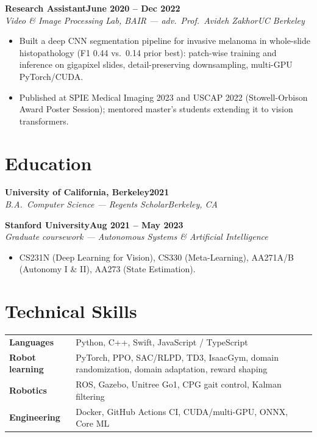 \documentclass[10pt]{article}
\newcommand{\role}[4]{\textbf{#1}\hfill\textbf{#2}\\\textit{#3}\hfill\textit{#4}}
\begin{document}
\role{Research Assistant}{June 2020 -- Dec 2022}{Video \& Image Processing Lab, BAIR --- adv.\ Prof.\ Avideh Zakhor}{UC Berkeley}
\begin{itemize}
\item Built a deep CNN segmentation pipeline for invasive melanoma in whole-slide histopathology (F1 0.44 vs.\ 0.14 prior best): patch-wise training and inference on gigapixel slides, detail-preserving downsampling, multi-GPU PyTorch/CUDA.
\item Published at SPIE Medical Imaging 2023 and USCAP 2022 (Stowell-Orbison Award Poster Session); mentored master's students extending it to vision transformers.
\end{itemize}


\section*{Education}

\role{University of California, Berkeley}{2021}{B.A.\ Computer Science --- Regents Scholar}{Berkeley, CA}

\role{Stanford University}{Aug 2021 -- May 2023}{Graduate coursework --- Autonomous Systems \& Artificial Intelligence}{}
\begin{itemize}
\item CS231N (Deep Learning for Vision), CS330 (Meta-Learning), AA271A/B (Autonomy I \& II), AA273 (State Estimation).
\end{itemize}

\section*{Technical Skills}
\begin{tabular}{@{}p{0.9in}l}
\textbf{Languages} & Python, C++, Swift, JavaScript / TypeScript \\
\textbf{Robot learning} & PyTorch, PPO, SAC/RLPD, TD3, IsaacGym, domain randomization, domain adaptation, reward shaping \\
\textbf{Robotics} & ROS, Gazebo, Unitree Go1, CPG gait control, Kalman filtering \\
\textbf{Engineering} & Docker, GitHub Actions CI, CUDA/multi-GPU, ONNX, Core ML \\
\end{tabular}
\end{document}
